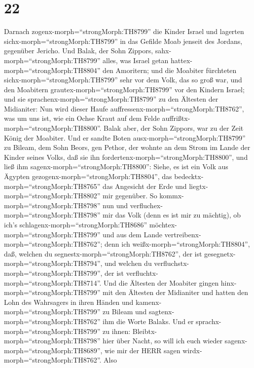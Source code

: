 \hypertarget{section-21}{%
\section{22}\label{section-21}}

 Darnach zogenx-morph=``strongMorph:TH8799'' die Kinder
Israel und lagerten sichx-morph=``strongMorph:TH8799'' in das Gefilde
Moab jenseit des Jordans, gegenüber Jericho.  Und Balak, der
Sohn Zippors, sahx-morph=``strongMorph:TH8799'' alles, was Israel getan
hattex-morph=``strongMorph:TH8804'' den Amoritern;  und die
Moabiter fürchteten sichx-morph=``strongMorph:TH8799'' sehr vor dem
Volk, das so groß war, und den Moabitern
grautex-morph=``strongMorph:TH8799'' vor den Kindern Israel;
 und sie sprachenx-morph=``strongMorph:TH8799'' zu den
Ältesten der Midianiter: Nun wird dieser Haufe
auffressenx-morph=``strongMorph:TH8762'', was um uns ist, wie ein Ochse
Kraut auf dem Felde auffrißtx-morph=``strongMorph:TH8800''. Balak aber,
der Sohn Zippors, war zu der Zeit König der Moabiter.  Und
er sandte Boten ausx-morph=``strongMorph:TH8799'' zu Bileam, dem Sohn
Beors, gen Pethor, der wohnte an dem Strom im Lande der Kinder seines
Volks, daß sie ihn fordertenx-morph=``strongMorph:TH8800'', und ließ ihm
sagenx-morph=``strongMorph:TH8800'': Siehe, es ist ein Volk aus Ägypten
gezogenx-morph=``strongMorph:TH8804'', das
bedecktx-morph=``strongMorph:TH8765'' das Angesicht der Erde und
liegtx-morph=``strongMorph:TH8802'' mir gegenüber.  So
kommx-morph=``strongMorph:TH8798'' nun und
verfluchex-morph=``strongMorph:TH8798'' mir das Volk (denn es ist mir zu
mächtig), ob ich's schlagenx-morph=``strongMorph:TH8686''
möchtex-morph=``strongMorph:TH8799'' und aus dem Lande
vertreibenx-morph=``strongMorph:TH8762''; denn ich
weißx-morph=``strongMorph:TH8804'', daß, welchen du
segnestx-morph=``strongMorph:TH8762'', der ist
gesegnetx-morph=``strongMorph:TH8794'', und welchen du
verfluchstx-morph=``strongMorph:TH8799'', der ist
verfluchtx-morph=``strongMorph:TH8714''.  Und die Ältesten
der Moabiter gingen hinx-morph=``strongMorph:TH8799'' mit den Ältesten
der Midianiter und hatten den Lohn des Wahrsagers in ihren Händen und
kamenx-morph=``strongMorph:TH8799'' zu Bileam und
sagtenx-morph=``strongMorph:TH8762'' ihm die Worte Balaks. 
Und er sprachx-morph=``strongMorph:TH8799'' zu ihnen:
Bleibtx-morph=``strongMorph:TH8798'' hier über Nacht, so will ich euch
wieder sagenx-morph=``strongMorph:TH8689'', wie mir der HERR sagen
wirdx-morph=``strongMorph:TH8762''. Also
